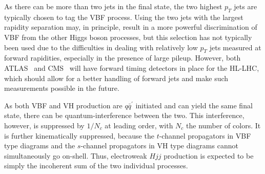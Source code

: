 \documentclass[10pt,prd,fleqn,superscriptaddress,notitlepage,nofootinbib,preprintnumbers,nobalancelastpage]{revtex4-1}
\newcommand{\VBF}{VBF\xspace}
\newcommand{\VH}{VH\xspace}
\begin{document}
As there can be more than two jets in the final state, the two highest $p_T$ jets are typically chosen to tag the \VBF process. Using the two jets with the largest rapidity separation may, in principle, result in a more powerful discrimination of \VBF from the other Higgs boson processes, but this selection has not typically been used due to the difficulties in dealing with relatively low $p_T$ jets measured at forward rapidities, especially in the presence of large pileup. However, both ATLAS~\cite{CERN-LHCC-2020-007} and CMS~\cite{CMS:2667167} will have forward timing detectors in place for the HL-LHC, which should allow for a better handling of forward jets and make such measurements possible in the future.

As both \VBF and \VH production are $q\bar{q}^\prime$ initiated and can yield the same final state, there can be quantum-interference between the two. This interference, however, is suppressed by $1/N_c$ at leading order, with $N_c$ the number of colors. It is further kinematically suppressed, because the $t$-channel propagators in \VBF type diagrams and the $s$-channel propagators in \VH type diagrams cannot simultaneously go on-shell. Thus, electroweak $Hjj$ production is expected to be simply the incoherent sum of the two individual processes.
\end{document}
